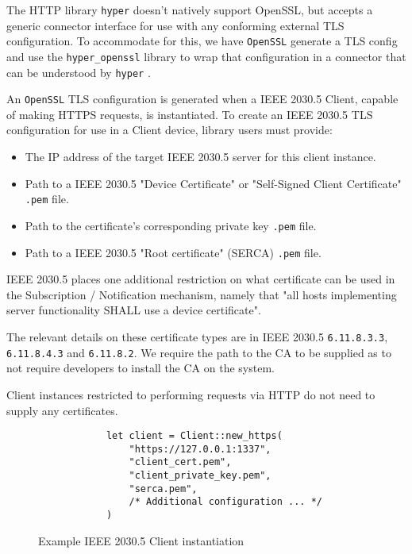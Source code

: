 The HTTP library \texttt{hyper} doesn't natively support OpenSSL, but accepts a generic connector interface for use with any conforming external TLS configuration. To accommodate for this, we have \texttt{OpenSSL} generate a TLS config and use the \texttt{hyper\_openssl} library to wrap that configuration in a connector that can be understood by \texttt{hyper} \cite{hyperopenssl}. 

An \texttt{OpenSSL} TLS configuration is generated when a IEEE 2030.5 Client, capable of making HTTPS requests, is instantiated. To create an IEEE 2030.5 TLS configuration for use in a Client device, library users must provide:

\begin{itemize}
    \item The IP address of the target IEEE 2030.5 server for this client instance.
    \item Path to a IEEE 2030.5 "Device Certificate" or "Self-Signed Client Certificate" \texttt{.pem} file.
    \item Path to the certificate's corresponding private key \texttt{.pem} file.
    \item Path to a IEEE 2030.5 "Root certificate" (SERCA) \texttt{.pem} file. 
\end{itemize}

IEEE 2030.5 places one additional restriction on what certificate can be used in the Subscription / Notification mechanism, namely that "all hosts implementing server functionality SHALL use a device certificate".

The relevant details on these certificate types are in IEEE 2030.5 \texttt{6.11.8.3.3}, \texttt{6.11.8.4.3} and \texttt{6.11.8.2}. We require the path to the CA to be supplied as to not require developers to install the CA on the system.

Client instances restricted to performing requests via HTTP do not need to supply any certificates.

\begin{figure}[h]
    \begin{center}
        \begin{lstlisting}
            let client = Client::new_https(
                "https://127.0.0.1:1337",
                "client_cert.pem",
                "client_private_key.pem",
                "serca.pem",
                /* Additional configuration ... */
            )
        \end{lstlisting}
        \label{fig:httpsclientexample}
        \vspace{-10pt}
        \caption{Example IEEE 2030.5 Client instantiation}
    \end{center}
\end{figure}

